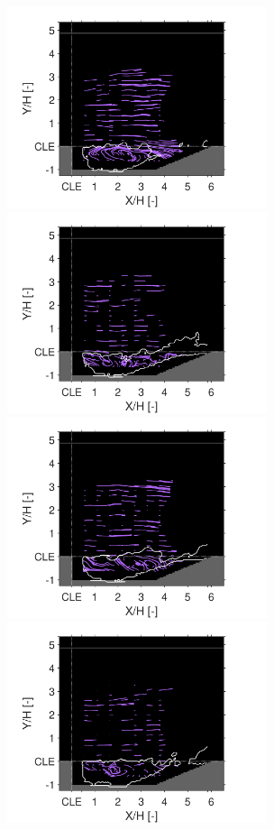 \begin{figure}
\centering
{}
      {\includegraphics[width=3in,trim=0.35in 0 0.65in 0, clip]{figures/B1/combustion_instability/streamlines/B1_Frame331_v2.pdf}}
      \hspace{0.4cm}
                {\includegraphics[width=3in,trim=0.35in 0 0.65in 0, clip]{figures/B1/combustion_instability/streamlines/B1_Frame329_v2.pdf}}
                \newline
{}
        {\includegraphics[width=3in,trim=0.35in 0 0.65in 0, clip]{figures/B1/combustion_instability/streamlines/B1_Frame342_v2.pdf}}
        \hspace{0.4cm}
                {\includegraphics[width=3in,trim=0.35in 0 0.65in 0, clip]{figures/B1/combustion_instability/streamlines/B1_Frame339_v2.pdf}}

\end{figure}
